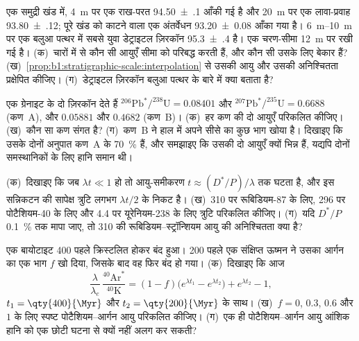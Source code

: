 \begin{exercise}[$\star\star$]\label{exo:b1:radiometric-methods:8}
एक समुद्री खंड में, \qty{4}{m} पर एक राख-परत \qty[uncertainty-mode=separate]{94.50(10)}{\Ma} आँकी गई है और \qty{20}{m} पर एक लावा-प्रवाह \qty[uncertainty-mode=separate]{93.80(12)}{\Ma}; पूरे खंड को काटने वाला एक अंतर्वेधन \qty[uncertainty-mode=separate]{93.20(8)}{\Ma} आँका गया है। \qtyrange{6}{10}{m} पर एक बलुआ पत्थर में सबसे युवा डेट्राइटल ज़िरकॉन \qty[uncertainty-mode=separate]{95.3(4)}{\Ma} है। एक चरण-सीमा \qty{12}{m} पर रखी गई है। (क)~चारों में से कौन सी आयुएँ सीमा को परिबद्ध करती हैं, और कौन सी उसके लिए बेकार हैं? (ख)~\cref{prop:b1:stratigraphic-scale:interpolation} से उसकी आयु और उसकी अनिश्चितता प्रक्षेपित कीजिए। (ग)~डेट्राइटल ज़िरकॉन बलुआ पत्थर के बारे में क्या बताता है?
\end{exercise}

\begin{exercise}[$\star\star$]\label{exo:b1:radiometric-methods:9}
एक ग्रेनाइट के दो ज़िरकॉन देते हैं $^{206}\mathrm{Pb}^*/^{238}\mathrm{U} = 0.08401$ और $^{207}\mathrm{Pb}^*/^{235}\mathrm{U} = 0.6688$ (कण~A), और $0.05881$ और $0.4682$ (कण~B)। (क)~हर कण की दो आयुएँ परिकलित कीजिए। (ख)~कौन सा कण संगत है? (ग)~कण~B ने हाल में अपने सीसे का कुछ भाग खोया है। दिखाइए कि उसके दोनों अनुपात कण~A के \qty{70}{\percent} हैं, और समझाइए कि उसकी दो आयुएँ क्यों भिन्न हैं, यद्यपि दोनों समस्थानिकों के लिए हानि समान थी।
\end{exercise}

\begin{exercise}[$\star\star\star$]\label{exo:b1:radiometric-methods:10}
(क)~दिखाइए कि जब $\lambda t \ll 1$ हो तो आयु-समीकरण $t \approx
(D^*/P)/\lambda$ तक घटता है, और इस सन्निकटन की सापेक्ष त्रुटि लगभग $\lambda t/2$ के निकट है। (ख)~\qty{310}{\Ma} पर रूबिडियम-87 के लिए, \qty{296}{\Ma} पर पोटैशियम-40 के लिए और \qty{4.4}{\Ga} पर यूरेनियम-238 के लिए त्रुटि परिकलित कीजिए। (ग)~यदि $D^*/P$ \qty{0.1}{\percent} तक मापा जाए, तो \qty{310}{\Ma} की रूबिडियम–स्ट्रॉन्शियम आयु की अनिश्चितता क्या है?
\end{exercise}

\begin{exercise}[$\star\star\star$]\label{exo:b1:radiometric-methods:11}
एक बायोटाइट \qty{400}{\Myr} पहले क्रिस्टलित होकर बंद हुआ। \qty{200}{\Myr} पहले एक संक्षिप्त ऊष्मन ने उसका आर्गन का एक भाग $f$ खो दिया, जिसके बाद वह फिर बंद हो गया। (क)~दिखाइए कि आज
\[
  \frac{\lambda}{\lambda_e}\,\frac{^{40}\mathrm{Ar}^*}{^{40}\mathrm{K}} =
  (1 - f)\bigl(e^{\lambda t_1} - e^{\lambda t_2}\bigr) + e^{\lambda t_2} - 1,
\]
$t_1 = \qty{400}{\Myr}$ और $t_2 = \qty{200}{\Myr}$ के साथ। (ख)~$f = 0$, $0.3$, $0.6$ और $1$ के लिए स्पष्ट पोटैशियम–आर्गन आयु परिकलित कीजिए। (ग)~एक ही पोटैशियम–आर्गन आयु आंशिक हानि को एक छोटी घटना से क्यों नहीं अलग कर सकती?
\end{exercise}

